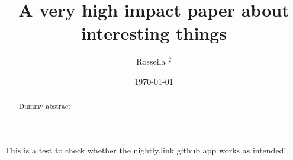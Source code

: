 \documentclass[prd,amssymb,amsmath,amsfonts,nofootinbib,reprint,showpacs, longbibliography]{revtex4-1}
\begin{document}
\title{A very high impact paper about interesting things}
\author{Rossella ${}^{2}$}



\begin{abstract}
Dummy abstract
\end{abstract}
\date{\today}
\maketitle

This is a test to check whether the nightly.link github app works as intended!


\end{document}
